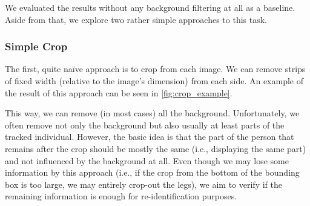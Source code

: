We evaluated the results without any background filtering at all as a baseline. Aside from that, we explore two rather simple approaches to this task. 

\subsubsection{Simple Crop}

The first, quite naïve approach is to crop from each image. We can remove strips of fixed width (relative to the image's dimension) from each side. An example of the result of this approach can be seen in \autoref{fig:crop_example}.

This way, we can remove (in most cases) all the background. Unfortunately, we often remove not only the background but also usually at least parts of the tracked individual. However, the basic idea is that the part of the person that remains after the crop should be mostly the same (i.e., displaying the same part) and not influenced by the background at all. Even though we may lose some information by this approach (i.e., if the crop from the bottom of the bounding box is too large, we may entirely crop-out the legs), we aim to verify if the remaining information is enough for re-identification purposes.



